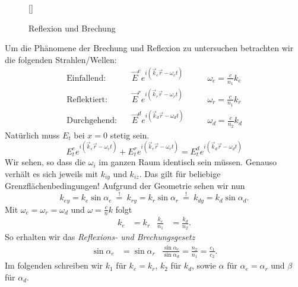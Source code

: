 \begin{wrapfigure}[11]{r}[0cm]{0cm}
	\raisebox{0pt}[\dimexpr{}\baselineskip\relax]{
		\colorbox{hgrey}{
		}
	}
	\caption{Reflexion und Brechung}
\end{wrapfigure}
Um die Phänomene der Brechung und Reflexion zu untersuchen betrachten wir die folgenden Strahlen/Wellen:
\begin{align*}
\text{Einfallend:}\quad &\vec{E}^e e^{i(\vec{k}_e\vec{r}-\omega_e t)} &\qquad \omega_e =\frac{c}{n_1}k_e \\
\text{Reflektiert:}\quad&\vec{E}^r e^{i(\vec{k}_r\vec{r}-\omega_r t)} &\qquad \omega_r = \frac{c}{n_1}k_r \\
\text{Durchgehend:}\quad &\vec{E}^d e^{i(\vec{k}_d\vec{r}-\omega_d t)}&\qquad \omega_d=\frac{c}{n_2}k_d
\end{align*}
Natürlich muss $E_t$ bei $x=0$ stetig sein. 
\begin{equation*}
E_t^e e^{i(\vec{k}_e\vec{r}-\omega_e t)} + E_t^r e^{i(\vec{k}_r\vec{r}-\omega_r t)} = E_t^d e^{i(\vec{k}_d\vec{r}-\omega_d t)}
\end{equation*}
Wir sehen, so dass die $\omega_i$ im ganzen Raum identisch sein müssen. Genauso verhält es sich jeweils mit $k_{iy}$ und $k_{iz}$. Das gilt für beliebige Grenzflächenbedingungen! Aufgrund der Geometrie sehen wir nun
\begin{equation*}
k_{ey}=k_e\sin\alpha_e\ \stackrel{!}{=}\ k_{ry} = k_r\sin\alpha_r\ \stackrel{!}{=}\
k_{dy}=k_d\sin\alpha_d.
\end{equation*}
Mit $\omega_e=\omega_r=\omega_d$ und $\omega=\frac{c}{n}k$ folgt
\begin{align*}
k_e&=k_r &\frac{k_e}{n_1}&=\frac{k_d}{n_2}.
\end{align*}
So erhalten wir das \emph{Reflexions- und Brechungsgesetz}
\begin{align*}
\sin\alpha_e &=\sin\alpha_r &\frac{\sin\alpha_e}{\sin\alpha_d}=\frac{n_2}{n_1}=\frac{c_1}{c_2}.
\end{align*}
Im folgenden schreiben wir $k_1$ für $k_e=k_r$, $k_2$ für $k_d$, sowie $\alpha$ für $\alpha_e=\alpha_r$ und $\beta$ für $\alpha_d$.\\

